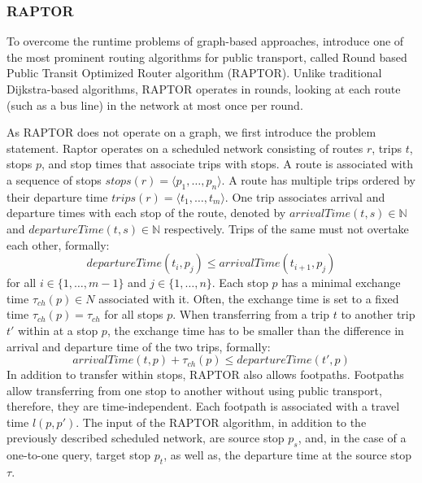 \subsubsection{RAPTOR}
\label{subsubsec:raptor}

To overcome the runtime problems of graph-based approaches, \cite{dellingRoundBasedPublicTransit2015} introduce one of the most prominent routing algorithms for public transport, called Round based Public Transit Optimized Router algorithm (RAPTOR). %
Unlike traditional Dijkstra-based algorithms, RAPTOR operates in rounds, looking at each route (such as a bus line) in the network at most once per round.

As RAPTOR does not operate on a graph, we first introduce the problem statement.
Raptor operates on a scheduled network consisting of routes \(r\), trips \(t\), stops \(p\), and stop times that associate trips with stops.
A route is associated with a sequence of stops \(stops(r) = \langle p_1, \dots, p_n \rangle\).
A route has multiple trips ordered by their departure time \(trips(r) = \langle t_1, \dots, t_m \rangle\).
One trip associates arrival and departure times with each stop of the route, denoted by \(arrivalTime(t, s) \in \mathbb{N}\) and \(departureTime(t, s) \in \mathbb{N}\) respectively.
Trips of the same must not overtake each other, formally:
\[departureTime(t_i, p_j) \leq arrivalTime(t_{i+1}, p_j)\]
for all \(i \in \{1, \dots, m-1\}\) and \(j \in \{1, \dots, n\}\).
Each stop \(p\) has a minimal exchange time \(\tau_{ch}(p) \in N\) associated with it.
Often, the exchange time is set to a fixed time \(\tau_{ch}(p) = \tau_{ch}\) for all stops \(p\).
When transferring from a trip \(t\) to another trip \(t'\) within at a stop \(p\), the exchange time has to be smaller than the difference in arrival and departure time of the two trips, formally:
\[arrivalTime(t, p) + \tau_{ch}(p) \leq departureTime(t', p) \]
In addition to transfer within stops, RAPTOR also allows footpaths.
Footpaths allow transferring from one stop to another without using public transport, therefore, they are time-independent.
Each footpath is associated with a travel time \(l(p, p')\).
The input of the RAPTOR algorithm, in addition to the previously described scheduled network, are source stop \(p_s\), and, in the case of a one-to-one query, target stop \(p_t\), as well as, the departure time at the source stop \(\tau\).

